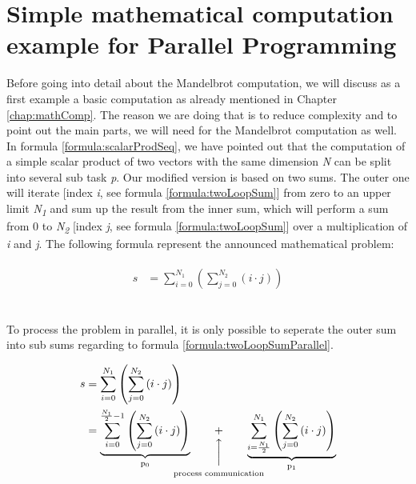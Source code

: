 \section{Simple mathematical computation example for Parallel Programming} \label{chap:simpleMathCompParallel}

Before going into detail about the Mandelbrot computation, we will discuss as a first example a basic computation as already mentioned in Chapter \ref{chap:mathComp}. The reason we are doing that is to reduce complexity and to point out the main parts, we will need for the Mandelbrot computation as well. In formula \ref{formula:scalarProdSeq}, we have pointed out that the computation of a simple scalar product of two vectors with the same dimension \textit{N} can be split into several sub task \textit{p}. Our modified version is based on two sums. The outer one will iterate [index \textit{i}, see formula \ref{formula:twoLoopSum}] from zero to an upper limit \textit{N\textsubscript{1}} and sum up the result from the inner sum, which will perform a sum from 0 to \textit{N\textsubscript{2}} [index \textit{j}, see formula \ref{formula:twoLoopSum}] over a multiplication of \textit{i} and \textit{j}. The following formula represent the announced mathematical problem:

\begin{align} \label{formula:twoLoopSum}
\begin{aligned}
s &= \sum_{i = 0}^{N_1} \left( \sum_{j = 0}^{N_2} \left(i \cdot j\right) \right)
\end{aligned}
\end{align}
\

To process the problem in parallel, it is only possible to seperate the outer sum into sub sums regarding to formula \ref{formula:twoLoopSumParallel}.

\begin{align} \label{formula:twoLoopSumParallel}
\begin{aligned}
s &= \sum_{i = 0}^{N_1} \left( \sum_{j = 0}^{N_2} \left(i \cdot j\right) \right)
\\ &=  \underbrace{ 
	\sum_{i = 0}^{\frac{N_1}{2} - 1} \left( \sum_{j = 0}^{N_2} \left(i \cdot j\right) \right)
}_\text{p\textsubscript{0}} \qquad \vertarrowbox{+}{process communication} \qquad \underbrace{  
	\sum_{i = \frac{N_1}{2}}^{N_1} \left( \sum_{j = 0}^{N_2} \left(i \cdot j\right) \right)
}_\text{p\textsubscript{1}}
\end{aligned}
\end{align}
\

